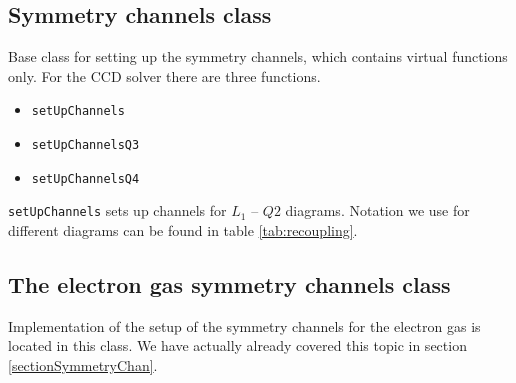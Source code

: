 \documentclass[twoside,english]{uiofysmaster}
\newcommand{\classname}[1]{\texttt{#1}}
\begin{document}
\subsection{Symmetry channels class}
Base class for setting up the symmetry channels, which contains virtual functions only.
For the CCD solver there are three functions. 
\begin{itemize}
\item \classname{setUpChannels}
\item \classname{setUpChannelsQ3}
\item \classname{setUpChannelsQ4}
\end{itemize}
\classname{setUpChannels} sets up channels for $L_1$ -- $Q2$ diagrams. Notation we use for different diagrams can be found in table \ref{tab:recoupling}.

\subsection{The electron gas symmetry channels class}
Implementation of the setup of the symmetry channels for the electron gas is located in this class. We have actually already covered this topic in section \ref{sectionSymmetryChan}.
\end{document}
